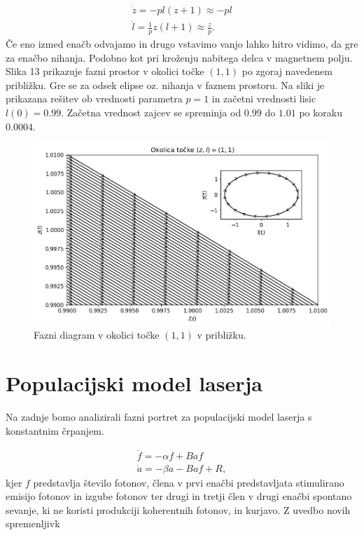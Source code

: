 \documentclass[slovene,11pt,a4paper]{article}
\begin{document}
\begin{itemize}
\begin{align}
\dot{z} = - pl(z+1) \approx -pl \\
\dot{l} = \frac{1}{p} z(l+1) \approx \frac{z}{p}.
\end{align}
Če eno izmed enačb odvajamo in drugo vstavimo vanjo lahko hitro vidimo, da gre za enačbo nihanja. Podobno kot pri kroženju nabitega delca v magnetnem polju. Slika 13 prikazuje fazni prostor v okolici točke $(1,1)$ po zgoraj navedenem približku. Gre se za odsek elipse oz. nihanja v faznem prostoru. Na sliki je prikazana rešitev ob vrednosti parametra $p=1$ in začetni vrednosti lisic $l(0) = 0.99$. Začetna vrednost zajcev se spreminja od $0.99$ do $1.01$ po koraku $0.0004$.

\begin{figure}[h!]
\centering
\includegraphics[width=13.5cm]{zajci5.png}
\caption{Fazni diagram v okolici točke $(1,1)$ v približku.}
\end{figure}

\end{itemize}

\section{Populacijski model laserja}

Na zadnje bomo analizirali fazni portret za populacijski model laserja s konstantnim črpanjem.

\begin{align}
\dot{f} = -\alpha f + B af \\
\dot{a} = -\beta a - B af + R,
\end{align}
kjer $f$ predstavlja število fotonov, člena v prvi enačbi predstavljata stimulirano emisijo fotonov in izgube fotonov ter drugi in tretji člen v drugi enačbi spontano sevanje, ki ne koristi produkciji koherentnih fotonov, in kurjavo. Z uvedbo novih spremenljivk
\end{document}
